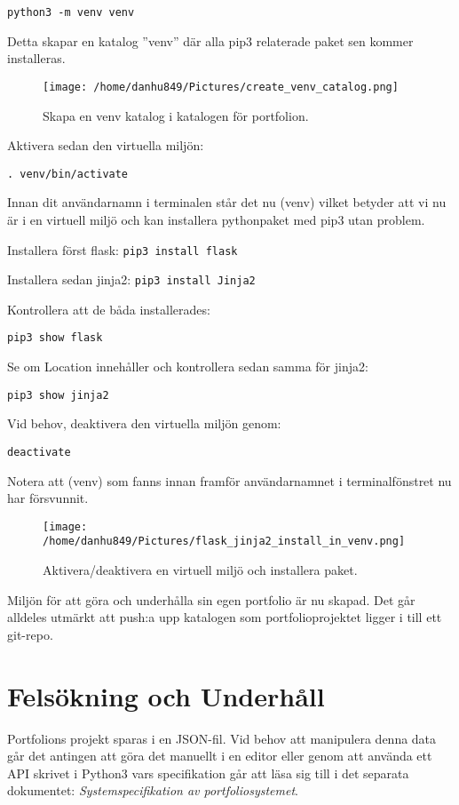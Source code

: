 \documentclass{TDP003mall}
\begin{document}
\texttt{python3 -m venv venv}

Detta skapar en katalog ''venv'' där alla pip3 relaterade paket sen kommer installeras. 

\begin{figure}[h]
  \centerline{\texttt{[image: /home/danhu849/Pictures/create\_venv\_catalog.png]}}
  \caption{Skapa en venv katalog i katalogen för portfolion.}
  \label{fig}
\end{figure}

Aktivera sedan den virtuella miljön:

\texttt{. venv/bin/activate}

Innan dit användarnamn i terminalen står det nu (venv) vilket betyder att vi nu är i en virtuell miljö och kan installera pythonpaket med pip3 utan problem.

Installera först flask: \texttt{pip3 install flask}

Installera sedan jinja2: \texttt{pip3 install Jinja2}

Kontrollera att de båda installerades:

\texttt{pip3 show flask}

Se om Location innehåller  och kontrollera sedan samma för jinja2:

\texttt{pip3 show jinja2}

Vid behov, deaktivera den virtuella miljön genom:

\texttt{deactivate}

Notera att (venv) som fanns innan framför användarnamnet i terminalfönstret nu har försvunnit.

\begin{figure}[h]
  \centerline{\texttt{[image: /home/danhu849/Pictures/flask\_jinja2\_install\_in\_venv.png]}}
  \caption{Aktivera/deaktivera en virtuell miljö och installera paket.}
  \label{fig}
\end{figure}

Miljön för att göra och underhålla sin egen portfolio är nu skapad. Det går alldeles utmärkt att push:a upp katalogen som portfolioprojektet ligger i till ett git-repo.


\section{Felsökning och Underhåll}
Portfolions projekt sparas i en JSON-fil. Vid behov att manipulera denna data går det antingen att göra det manuellt i en editor eller genom att använda ett API skrivet i Python3 vars specifikation går att läsa sig till i det separata dokumentet: \emph{Systemspecifikation av portfoliosystemet}.
\end{document}
